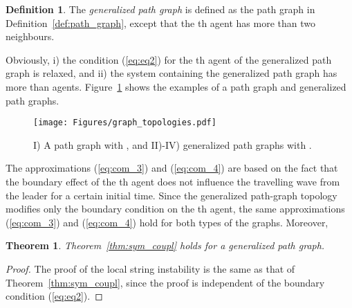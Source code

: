 \documentclass[10pt,twocolumn,twoside]{IEEEtran}
\newtheorem{theorem}{Theorem}
\theoremstyle{definition}
\newtheorem{defn}{Definition}
\newcommand{\revA}{Black}
\begin{document}
{\color{\revA}
\begin{defn}\label{def:generalized_path_graph}
The \emph{generalized path graph} is defined as the path graph in Definition~\ref{def:path_graph}, except that the th agent has more than two neighbours.
\end{defn}
Obviously, i) the condition (\ref{eq:eq2}) for the th agent of the generalized path graph is relaxed, and ii) the system containing the generalized path graph has more than  agents. Figure~\ref{fig:graph_topologies} shows the examples of a path graph and generalized path graphs.
}

\begin{figure}[ht]
 \centering
  \texttt{[image: Figures/graph\_topologies.pdf]}
 \caption{{\color{\revA}I) A path graph with , and II)-IV) generalized path graphs with .}}
  \label{fig:graph_topologies}
\end{figure}

{\color{\revA}The approximations (\ref{eq:com_3}) and (\ref{eq:com_4}) are based on the fact that the boundary effect of the th agent does not influence the travelling wave from the leader for a certain initial time. Since the generalized path-graph topology modifies only the boundary condition on the th agent, the same approximations (\ref{eq:com_3}) and (\ref{eq:com_4}) hold for both types of the graphs. Moreover,
\begin{theorem}\label{thm:sym_coupl_generalized}
  Theorem~\ref{thm:sym_coupl} holds for a generalized path graph.
\end{theorem}
\begin{proof}
The proof of the local string instability is the same as that of Theorem~\ref{thm:sym_coupl}, since the proof is independent of the boundary condition (\ref{eq:eq2}).
\end{proof}}
\end{document}
